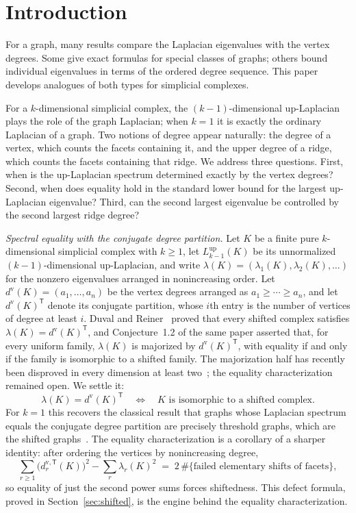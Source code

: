 \documentclass[11pt,reqno]{amsart}
\numberwithin{equation}{section}
\theoremstyle{plain}
\theoremstyle{definition}
\newcommand{\Lup}{L^{\mathrm{up}}}
\newcommand{\T}{\mathsf{T}}
\begin{document}
\section{Introduction}

For a graph, many results compare the Laplacian eigenvalues with the vertex degrees.
Some give exact formulas for special classes of graphs; others bound individual
eigenvalues in terms of the ordered degree sequence. This paper develops
analogues of both types for simplicial complexes.

For a $k$-dimensional simplicial complex, the $(k-1)$-dimensional up-Laplacian plays
the role of the graph Laplacian; when $k=1$ it is exactly the ordinary Laplacian of a
graph. Two notions of degree appear naturally: the degree of a vertex, which counts
the facets containing it, and the upper degree of a ridge, which counts the facets
containing that ridge. We address three questions. First, when is the up-Laplacian
spectrum determined exactly by the vertex degrees? Second, when does equality hold in
the standard lower bound for the largest up-Laplacian eigenvalue? Third, can the
second largest eigenvalue be controlled by the second largest ridge degree?

\smallskip
\noindent\emph{Spectral equality with the conjugate degree partition.}
Let $K$ be a finite pure $k$-dimensional simplicial complex with $k\ge1$, let
$\Lup_{k-1}(K)$ be its unnormalized $(k-1)$-dimensional up-Laplacian, and write
$\lambda(K)=(\lambda_1(K),\lambda_2(K),\ldots)$ for the nonzero eigenvalues arranged
in nonincreasing order. Let $d^{\mathrm v}(K)=(a_1,\ldots,a_n)$ be the vertex degrees
arranged as $a_1\ge\cdots\ge a_n$, and let ${d^{\mathrm v}(K)}^{\T}$ denote its
conjugate partition, whose $i$th entry is the number of vertices of degree at least
$i$. Duval and Reiner~\cite{DuvalReiner} proved that every shifted complex satisfies
$\lambda(K)={d^{\mathrm v}(K)}^{\T}$, and Conjecture~1.2 of the same paper asserted
that, for every uniform family, $\lambda(K)$ is majorized by ${d^{\mathrm v}(K)}^{\T}$,
with equality if and only if the family is isomorphic to a shifted family. The majorization
half has recently been disproved in every dimension at least two~\cite{Huang,ZhangSongFan};
the equality characterization remained open. We settle it:
\[
  \lambda(K)={d^{\mathrm v}(K)}^{\T}
  \quad\Longleftrightarrow\quad
  K\text{ is isomorphic to a shifted complex}.
\]
For $k=1$ this recovers the classical result that graphs whose Laplacian spectrum
equals the conjugate degree partition are precisely threshold graphs, which are the
shifted graphs~\cite{Merris}. The equality characterization is a corollary of a sharper
identity: after ordering the vertices by nonincreasing degree,
\[
  \sum_{r\ge1}\bigl(d^{\mathrm v,\T}_r(K)\bigr)^2-\sum_r\lambda_r(K)^2
  \;=\;2\,\#\{\text{failed elementary shifts of facets}\},
\]
so equality of just the second power sums forces shiftedness. This defect formula,
proved in Section~\ref{sec:shifted}, is the engine behind the equality
characterization.
\end{document}
